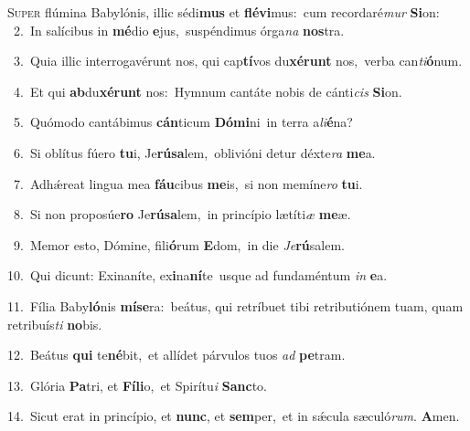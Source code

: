 \lettrine{\initial\textcolor{\initialcolor}{S}}{uper} flúmina Babylónis, illic sédi\textbf{mus} et \textbf{flé}\-\textbf{vi}mus:~\star cum recordaré\textit{mur} \textbf{Si}\-on:\\
{\numbfont\textcolor{\numbcolor}{~2.}}~In salícibus in \textbf{mé}\-dio \textbf{e}\-jus,~\star suspéndimus órga\textit{na} \textbf{nos}\-tra.\par
{\numbfont\textcolor{\numbcolor}{~3.}}~Quia illic interrogavérunt nos, qui cap\-\textbf{tí}\-vos du\-\textbf{xé}\-\textbf{runt} nos,~\star verba can\-\textit{ti}\-\textbf{ó}num.\par
{\numbfont\textcolor{\numbcolor}{~4.}}~Et qui \textbf{ab}\-du\-\textbf{xé}\-\textbf{runt} nos:~\star Hymnum cantáte nobis de cánti\textit{cis} \textbf{Si}\-on.\par
{\numbfont\textcolor{\numbcolor}{~5.}}~Quómodo cantábimus \textbf{cán}\-ticum \textbf{Dó}\-\textbf{mi}ni~\star in terra a\-\textit{li}\-\textbf{é}na?\par
{\numbfont\textcolor{\numbcolor}{~6.}}~Si oblítus fúero \textbf{tu}\-i, Je\-\textbf{rú}\-\textbf{sa}lem,~\star oblivióni detur déxte\textit{ra} \textbf{me}\-a.\par
{\numbfont\textcolor{\numbcolor}{~7.}}~Adhǽreat lingua mea \textbf{fáu}\-cibus \textbf{me}\-is,~\star si non memíne\textit{ro} \textbf{tu}\-i.\par
{\numbfont\textcolor{\numbcolor}{~8.}}~Si non proposúe\textbf{ro} Je\-\textbf{rú}\-\textbf{sa}lem,~\star in princípio lætíti\textit{æ} \textbf{me}\-æ.\par
{\numbfont\textcolor{\numbcolor}{~9.}}~Memor esto, Dómine, fili\-\textbf{ó}\-rum \textbf{E}\-dom,~\star in die \textit{Je}\-\textbf{rú}salem.\par
{\numbfont\textcolor{\numbcolor}{10.}}~Qui dicunt: Exinaníte, ex\-\textbf{i}\-na\-\textbf{ní}\-te~\star usque ad fundaméntum \textit{in} \textbf{e}\-a.\par
{\numbfont\textcolor{\numbcolor}{11.}}~Fília Baby\-\textbf{ló}\-nis \textbf{mí}\-\textbf{se}ra:~\star beátus, qui retríbuet tibi retributiónem tuam, quam retribuís\textit{ti} \textbf{no}\-bis.\par
{\numbfont\textcolor{\numbcolor}{12.}}~Beátus \textbf{qui} te\-\textbf{né}\-bit,~\star et allídet párvulos tuos \textit{ad} \textbf{pe}\-tram.\par
{\numbfont\textcolor{\numbcolor}{13.}}~Glória \textbf{Pa}\-tri, et \textbf{Fí}\-\textbf{li}o,~\star et Spirítu\textit{i} \textbf{Sanc}\-to.\par
{\numbfont\textcolor{\numbcolor}{14.}}~Sicut erat in princípio, et \textbf{nunc}\-, et \textbf{sem}\-per,~\star et in sǽcula sæculó\-\textit{rum}\-. \textbf{A}\-men.\par
